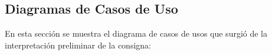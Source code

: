 \documentclass[10pt]{article} %
\begin{document}
\begin{figure}[H] %
\label{fig:Diagrama_de_Requerimientos1b}
\end{figure}

\begin{figure}[H] %
\label{fig:Diagrama_de_Requerimientos1c}
\end{figure}

\subsection{Diagramas de Casos de Uso}
En esta sección se muestra el diagrama de casos de usos que surgió de la interpretación preliminar de la consigna:
\end{document}
